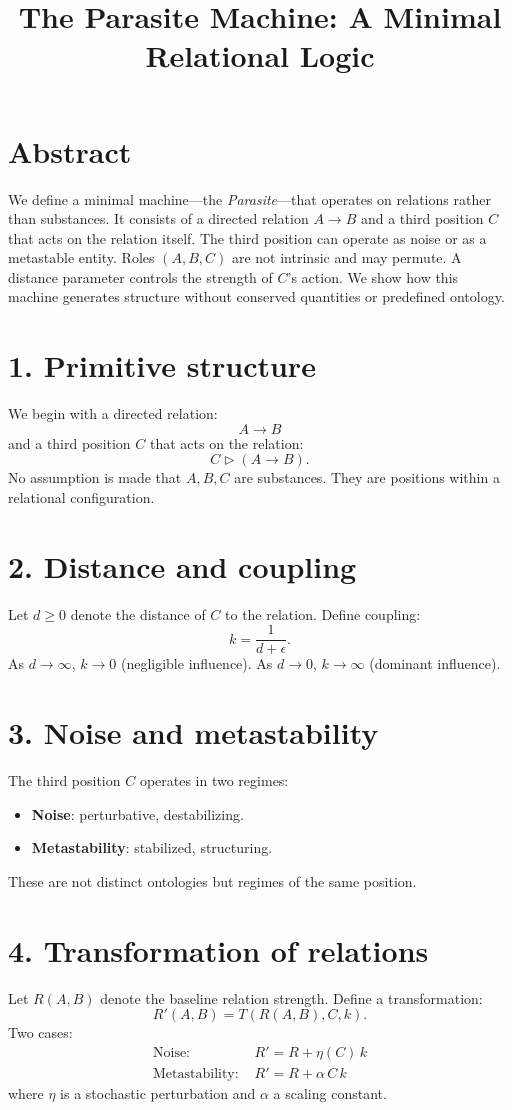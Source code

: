 \documentclass[11pt]{article}
\title{The Parasite Machine: A Minimal Relational Logic}
\author{}
\date{}
\begin{document}
\maketitle

\section*{Abstract}
We define a minimal machine---the \emph{Parasite}---that operates on relations rather than substances.
It consists of a directed relation $A \rightarrow B$ and a third position $C$ that acts on the relation itself.
The third position can operate as noise or as a metastable entity.
Roles $(A,B,C)$ are not intrinsic and may permute.
A distance parameter controls the strength of $C$'s action.
We show how this machine generates structure without conserved quantities or predefined ontology.

\section*{1. Primitive structure}
We begin with a directed relation:
\[
A \rightarrow B
\]
and a third position $C$ that acts on the relation:
\[
C \triangleright (A \rightarrow B).
\]
No assumption is made that $A,B,C$ are substances.
They are positions within a relational configuration.

\section*{2. Distance and coupling}
Let $d \ge 0$ denote the distance of $C$ to the relation.
Define coupling:
\[
k = \frac{1}{d + \epsilon}.
\]
As $d \to \infty$, $k \to 0$ (negligible influence).
As $d \to 0$, $k \to \infty$ (dominant influence).

\section*{3. Noise and metastability}
The third position $C$ operates in two regimes:
\begin{itemize}[leftmargin=2em]
\item \textbf{Noise}: perturbative, destabilizing.
\item \textbf{Metastability}: stabilized, structuring.
\end{itemize}
These are not distinct ontologies but regimes of the same position.

\section*{4. Transformation of relations}
Let $R(A,B)$ denote the baseline relation strength.
Define a transformation:
\[
R'(A,B) = T(R(A,B), C, k).
\]
Two cases:
\begin{align*}
\text{Noise: } & R' = R + \eta(C)\,k \\
\text{Metastability: } & R' = R + \alpha \, C \, k
\end{align*}
where $\eta$ is a stochastic perturbation and $\alpha$ a scaling constant.
\end{document}
